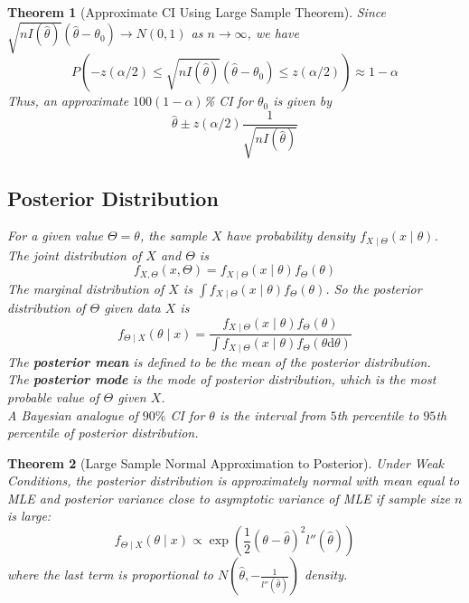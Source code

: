 \documentclass[12pt]{article}
\newcommand{\diff}{\mathrm{d}}
\newtheorem{theorem}{Theorem}[section]
\theoremstyle{definition}
\begin{document}
\begin{theorem}[Approximate CI Using Large Sample Theorem]
\normalfont Since $\sqrt{nI(\hat{\theta})}(\hat{\theta}-\theta_0)\to N(0,1)$ as $n\to\infty$, we have
\[
P(-z(\alpha/2)\leq \sqrt{nI(\hat{\theta})}(\hat{\theta}-\theta_0)\leq z(\alpha/2))\approx 1-\alpha
\]
Thus, an \textit{approximate} $100(1-\alpha)$\% CI for $\theta_0$ is given by
\[
\hat{\theta}\pm z(\alpha/2)\frac{1}{\sqrt{nI(\hat{\theta})}}
\]
\subsection{Posterior Distribution}
For a given value $\Theta=\theta$, the sample $X$ have probability density $f_{X\mid\Theta}(x\mid \theta)$. The joint distribution of $X$ and $\Theta$ is
\[
f_{X, \Theta}(x,\Theta)=f_{X\mid\Theta}(x\mid \theta)f_{\Theta}(\theta)
\]
The marginal distribution of $X$ is $\int f_{X\mid \Theta}(x\mid \theta)f_{\Theta}(\theta)$. So the posterior distribution of $\Theta$ given data $X$ is
\[
f_{\Theta\mid X}(\theta\mid x)=\frac{f_{X\mid \Theta}(x\mid \theta)f_{\Theta}(\theta)}{\int f_{X\mid \Theta}(x\mid \theta)f_{\Theta}(\theta\diff \theta)}
\]
The \textbf{posterior mean} is defined to be the mean of the posterior distribution. \\
The \textbf{posterior mode} is the mode of posterior distribution, which is the most probable value of $\Theta$ given $X$.\\
A Bayesian analogue of $90\%$ CI for $\theta$ is the interval from $5$th percentile to $95$th percentile of posterior distribution.
\end{theorem}
\begin{theorem}[Large Sample Normal Approximation to Posterior]
\normalfont Under Weak Conditions, the posterior distribution is approximately normal with mean equal to MLE and posterior variance close to asymptotic variance of MLE if sample size $n$ is large:
\[
f_{\Theta\mid X}(\theta\mid x)\propto \exp(\frac{1}{2}(\theta-\hat{\theta})^2l''(\hat{\theta}))
\]
where the last term is proportional to $N(\hat{\theta}, -\frac{1}{l''(\hat{\theta})})$ density.
\end{theorem}
\end{document}
